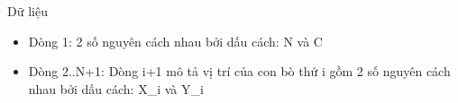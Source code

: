 Dữ liệu
\begin{itemize}
	\item     Dòng 1: 2 số nguyên cách nhau bởi dấu cách: N và C   
	\item     Dòng 2..N+1: Dòng i+1 mô tả vị trí của con bò thứ i gồm 2 số nguyên cách nhau bởi dấu cách: X\_i và Y\_i   
\end{itemize}